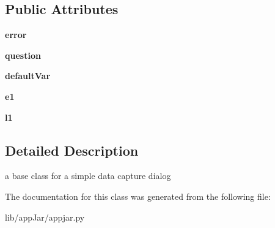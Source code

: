 \subsection*{Public Attributes}
\begin{DoxyCompactItemize}
\item 
\mbox{\label{classappjar_1_1_simple_entry_dialog_ada520c9bd979a73632ac2bea9906e77a}} 
{\bfseries error}
\item 
\mbox{\label{classappjar_1_1_simple_entry_dialog_ae607cca79a3ac2c021b8b01fc987c3f6}} 
{\bfseries question}
\item 
\mbox{\label{classappjar_1_1_simple_entry_dialog_a05550b738f53d18be399b349d5346849}} 
{\bfseries default\+Var}
\item 
\mbox{\label{classappjar_1_1_simple_entry_dialog_a2e012c893a6194ae8b09c48fb0463331}} 
{\bfseries e1}
\item 
\mbox{\label{classappjar_1_1_simple_entry_dialog_a6cdd2b7a701462b370f0eada7d78cf30}} 
{\bfseries l1}
\end{DoxyCompactItemize}


\subsection{Detailed Description}
\begin{DoxyVerb}a base class for a simple data capture dialog \end{DoxyVerb}
 

The documentation for this class was generated from the following file\+:\begin{DoxyCompactItemize}
\item 
lib/app\+Jar/appjar.\+py\end{DoxyCompactItemize}
